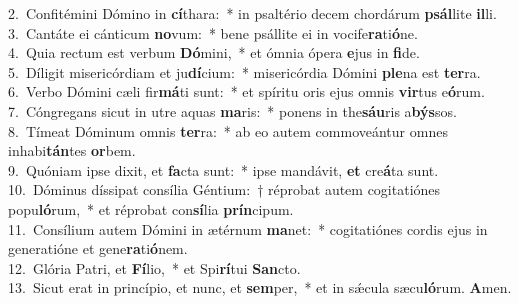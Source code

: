 {2.~}Confitémini Dómino in \textbf{cí}thara:~* in psaltério decem chordárum \textbf{psál}lite \textbf{il}li.\\
{3.~}Cantáte ei cánticum \textbf{no}vum:~* bene psállite ei in vocife\textbf{ra}ti\textbf{ó}ne.\\
{4.~}Quia rectum est verbum \textbf{Dó}mini,~* et ómnia ópera \textbf{e}jus in \textbf{fi}de.\\
{5.~}Díligit misericórdiam et ju\textbf{dí}cium:~* misericórdia Dómini \textbf{ple}na est \textbf{ter}ra.\\
{6.~}Verbo Dómini cæli fir\textbf{má}ti sunt:~* et spíritu oris ejus omnis \textbf{vir}tus e\textbf{ó}rum.\\
{7.~}Cóngregans sicut in utre aquas \textbf{ma}ris:~* ponens in the\textbf{sáu}ris a\textbf{býs}sos.\\
{8.~}Tímeat Dóminum omnis \textbf{ter}ra:~* ab eo autem commoveántur omnes inhabi\textbf{tán}tes \textbf{or}bem.\\
{9.~}Quóniam ipse dixit, et \textbf{fa}cta sunt:~* ipse mandávit, \textbf{et} cre\textbf{á}ta sunt.\\
{10.~}Dóminus díssipat consília Géntium:~† réprobat autem cogitatiónes popu\textbf{ló}rum,~* et réprobat con\textbf{sí}lia \textbf{prín}cipum.\\
{11.~}Consílium autem Dómini in ætérnum \textbf{ma}net:~* cogitatiónes cordis ejus in generatióne et gene\textbf{ra}ti\textbf{ó}nem.\\
{12.~}Glória Patri, et \textbf{Fí}lio,~* et Spi\textbf{rí}tui \textbf{San}cto.\\
{13.~}Sicut erat in princípio, et nunc, et \textbf{sem}per,~* et in sǽcula sæcu\textbf{ló}rum. \textbf{A}men.\\

